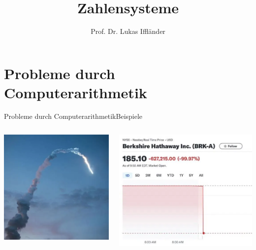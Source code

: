 \documentclass[xelatex,aspectratio=169]{beamer}
\title{Zahlensysteme}
\author{Prof. Dr. Lukas Iffländer}
\institute{HTW Dresden}
\date{}
\begin{document}
\begin{frame}
  \titlepage
\end{frame}

\section{Probleme durch Computerarithmetik}

\begin{frame}{Probleme durch Computerarithmetik}{Beispiele}
  \begin{columns}
    \begin{column}{0.5\textwidth}
      \includegraphics[width=\textwidth]{img/ariane_crash.png}
    \end{column}
    \begin{column}{0.5\textwidth}
      \includegraphics[width=\textwidth]{img/berkshire_crash.png}
    \end{column}
  \end{columns}
\end{frame}
\end{document}
